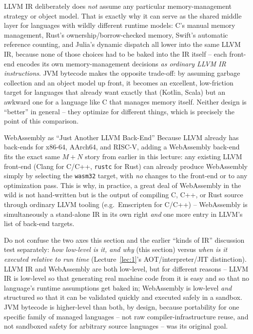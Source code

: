\documentclass[full-course-notes.tex]{subfiles}
\begin{document}
\begin{coreidea}
LLVM IR deliberately does \emph{not} assume any particular memory-management strategy or object
model. That is exactly why it can serve as the shared middle layer for languages with wildly
different runtime models: C's manual memory management, Rust's ownership/borrow-checked memory,
Swift's automatic reference counting, and Julia's dynamic dispatch all lower into the same LLVM
IR, because none of those choices had to be baked into the IR itself -- each front-end encodes
its own memory-management decisions \emph{as ordinary LLVM IR instructions}. JVM bytecode makes
the opposite trade-off: by assuming garbage collection and an object model up front, it becomes
an excellent, low-friction target for languages that already want exactly that (Kotlin, Scala)
but an awkward one for a language like C that manages memory itself. Neither design is
``better'' in general -- they optimize for different things, which is precisely the point of
this comparison.
\end{coreidea}

\begin{examplebox}{WebAssembly as ``Just Another LLVM Back-End''}
Because LLVM already has back-ends for x86-64, AArch64, and RISC-V, adding a WebAssembly
back-end fits the exact same $M+N$ story from earlier in this lecture: any existing LLVM
front-end (Clang for C/C++, \texttt{rustc} for Rust) can already produce WebAssembly simply by
selecting the \texttt{wasm32} target, with \emph{no} changes to the front-end or to any
optimization pass. This is why, in practice, a great deal of WebAssembly in the wild is not
hand-written but is the output of compiling C, C++, or Rust source through ordinary LLVM
tooling (e.g.\ Emscripten for C/C++) -- WebAssembly is simultaneously a stand-alone IR in its own
right \emph{and} one more entry in LLVM's list of back-end targets.
\end{examplebox}

\begin{examfocus}
Do not confuse the two axes this section and the earlier ``kinds of IR'' discussion test
separately: \emph{how low-level is it, and why} (this section) versus \emph{when is it executed
relative to run time} (Lecture~\ref{lec:1}'s AOT/interpreter/JIT distinction). LLVM IR and WebAssembly are
both low-level, but for different reasons -- LLVM IR is low-level so that generating real machine
code from it is easy and so that no language's runtime assumptions get baked in; WebAssembly is
low-level \emph{and} structured so that it can be validated quickly and executed safely in a
sandbox. JVM bytecode is higher-level than both, by design, because portability for one specific
family of managed languages -- not raw compiler-infrastructure reuse, and not sandboxed safety
for arbitrary source languages -- was its original goal.
\end{examfocus}
\end{document}
